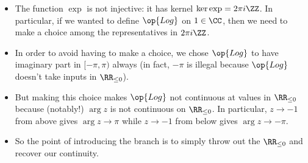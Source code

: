 \begin{itemize}
	\item The function $\exp$ is not injective: it has kernel $\ker\exp=2\pi i\ZZ$. In particular, if we wanted to define $\op{Log}$ on $1\in\CC$, then we need to make a choice among the representatives in $2\pi i\ZZ$.

	\item In order to avoid having to make a choice, we chose $\op{Log}$ to have imaginary part in $[-\pi,\pi)$ always (in fact, $-\pi$ is illegal because $\op{Log}$ doesn't take inputs in $\RR_{\le0}$).
	
	\item But making this choice makes $\op{Log}$ not continuous at values in $\RR_{\le0}$ because (notably!) $\arg z$ is not continuous on $\RR_{\le0}$. In particular, $z\to -1$ from above gives $\arg z\to\pi$ while $z\to-1$ from below gives $\arg z\to-\pi$.

	\item So the point of introducing the branch is to simply throw out the $\RR_{\le0}$ and recover our continuity.
\end{itemize}

